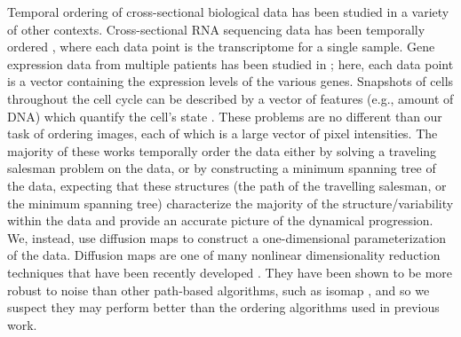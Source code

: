 \documentclass{pnastwo}
\begin{document}
\begin{article}
Temporal ordering of cross-sectional biological data has been studied in a variety of other contexts.
%
Cross-sectional RNA sequencing data has been temporally ordered \cite{anavy2014blind, trapnell2014dynamics}, where each data point is the transcriptome for a single sample.
%
Gene expression data from multiple patients has been studied in \cite{gupta2008extracting, qiu2011discovering};
here, each data point is a vector containing the expression levels of the various genes.
%
Snapshots of cells throughout the cell cycle can be described by a vector of features (e.g., amount of DNA) which quantify the cell's state  \cite{kafri2013dynamics}.
%
These problems are no different than our task of ordering images, each of which is a large vector of pixel intensities.
%
The majority of these works temporally order the data either by solving a traveling salesman problem on the data, or by constructing a minimum spanning tree of the data,
expecting that these structures (the path of the travelling salesman, or the minimum spanning tree) characterize the majority of the structure/variability within the data and provide an accurate picture of the dynamical progression.
%
We, instead, use diffusion maps to construct a one-dimensional parameterization of the data.
%
Diffusion maps are one of many nonlinear dimensionality reduction techniques that have been recently developed \cite{Belkin2003, tenenbaum2000global, Donoho2003, Roweis2000}.
%
They have been shown to be more robust to noise than other path-based algorithms, such as isomap \cite{balasubramanian2002isomap}, and so we suspect they may perform better than the ordering algorithms used in previous work.
%
%


\end{article}
\end{document}

